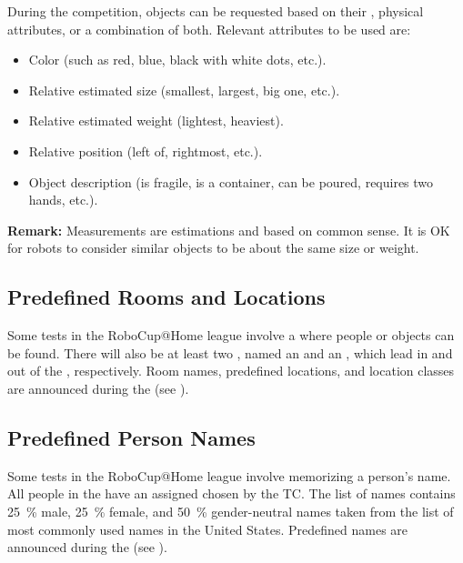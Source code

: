 During the competition, objects can be requested based on their \ObjectCategory, physical attributes, or a combination of both.
Relevant attributes to be used are:
\begin{itemize}
	\item Color (such as red, blue, black with white dots, etc.).
	\item Relative estimated size (smallest, largest, big one, etc.).
	\item Relative estimated weight (lightest, heaviest).
	\item Relative position (left of, rightmost, etc.).
	\item Object description (is fragile, is a container, can be poured, requires two hands, etc.).
\end{itemize}

\noindent\textbf{Remark:} Measurements are estimations and based on common sense. It is OK for robots to consider similar objects to be about the same size or weight.

%
%

\subsection{Predefined Rooms and Locations}
\label{rule:scenario_locations}

Some tests in the RoboCup@Home league involve a \PredefinedLocation{} where people or objects can be found.
There will also be at least two , named an \Entrance{} and an \Exit, which lead in and out of the \Arena{}, respectively.
Room names, predefined locations, and location classes are announced during the \SetupDays{} (see \Organisation).

\subsection{Predefined Person Names}
\label{rule:scenario_names}

Some tests in the RoboCup@Home league involve memorizing a person's name.
All people in the \Arena{} have an assigned \PredefinedName{} chosen by the TC.
The list of names contains \SI{25}{\percent} male, \SI{25}{\percent} female, and \SI{50}{\percent} gender-neutral names taken from the list of most commonly used names in the United States.
Predefined names are announced during the \SetupDays{} (see \Organisation).

